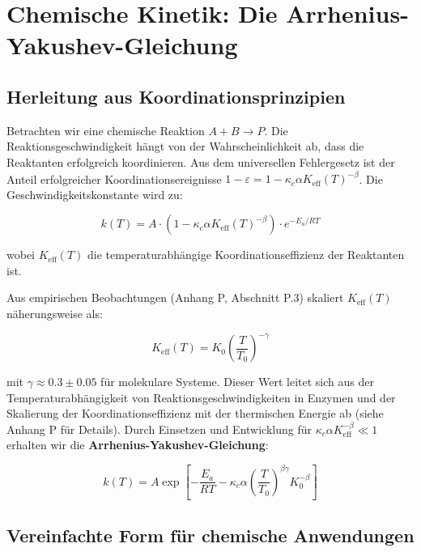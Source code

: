 \documentclass[12pt,a4paper]{article}
\newcommand{\Keff}{K_{\mathrm{eff}}}
\newcommand{\kappac}{\kappa_c}
\newcommand{\eps}{\varepsilon}
\begin{document}
	\section{Chemische Kinetik: Die Arrhenius-Yakushev-Gleichung}
	\label{sec:kinetics}
	
	\subsection{Herleitung aus Koordinationsprinzipien}
	
	Betrachten wir eine chemische Reaktion $A + B \rightarrow P$. Die Reaktionsgeschwindigkeit hängt von der Wahrscheinlichkeit ab, dass die Reaktanten erfolgreich koordinieren. Aus dem universellen Fehlergesetz ist der Anteil erfolgreicher Koordinationsereignisse $1 - \eps = 1 - \kappac \alpha \Keff(T)^{-\beta}$. Die Geschwindigkeitskonstante wird zu:
	
	\begin{equation}
		k(T) = A \cdot (1 - \kappac \alpha \Keff(T)^{-\beta}) \cdot e^{-E_a/RT}
		\label{eq:arrhenius-base}
	\end{equation}
	
	wobei $\Keff(T)$ die temperaturabhängige Koordinationseffizienz der Reaktanten ist.
	
	Aus empirischen Beobachtungen (Anhang P, Abschnitt P.3) skaliert $\Keff(T)$ näherungsweise als:
	
	\begin{equation}
		\Keff(T) = K_0 \left(\frac{T}{T_0}\right)^{-\gamma}
		\label{eq:K-T-scaling}
	\end{equation}
	
	mit $\gamma \approx 0.3 \pm 0.05$ für molekulare Systeme. Dieser Wert leitet sich aus der Temperaturabhängigkeit von Reaktionsgeschwindigkeiten in Enzymen und der Skalierung der Koordinationseffizienz mit der thermischen Energie ab (siehe Anhang P für Details). Durch Einsetzen und Entwicklung für $\kappac \alpha \Keff^{-\beta} \ll 1$ erhalten wir die \textbf{Arrhenius-Yakushev-Gleichung}:
	
	\begin{equation}
		\boxed{k(T) = A \exp\left[-\frac{E_a}{RT} - \kappac \alpha \left(\frac{T}{T_0}\right)^{\beta\gamma} K_0^{-\beta}\right]}
		\label{eq:arrhenius-yakushev}
	\end{equation}
	
	\subsection{Vereinfachte Form für chemische Anwendungen}
	
\end{document}
